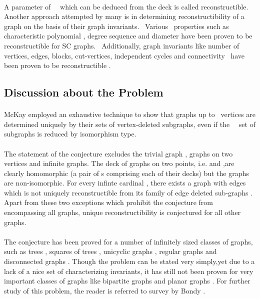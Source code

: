 \documentclass[12pt,conference]{IEEEtran}
\begin{document}
\paragraph*{} A parameter of    which can be deduced from the deck is called reconstructible.  Another approach attempted by many is in determining reconstructibility of a graph on the basis of their graph invariants.  Various  properties such as  characteristic polynomial \cite{e1}, degree sequence \cite{w1} and diameter \cite{s2} have been proven to be reconstructible for SC graphs.  Additionally, graph invariants like number of vertices, edges, blocks, cut-vertices, independent cycles and connectivity  have been proven to be reconstructible \cite{k2}. 

\subsection{ Discussion about the Problem }
\paragraph*{} McKay\cite{b1} employed an exhaustive technique to show that graphs up to   vertices are determined uniquely by their sets of vertex-deleted subgraphs, even if the   set of subgraphs is reduced by isomorphism type.  
\paragraph*{} The statement of the conjecture excludes the trivial graph , graphs on two vertices and infinite graphs. The deck of graphs on two points, i.e.  and ,are clearly homomorphic (a pair of s comprising each of their decks) but the graphs are non-isomorphic. For every infinte cardinal , there exists a graph with  edges which is not uniquely reconstructible from its family of edge deleted sub-graphs \cite{c1} .
Apart from these two exceptions which prohibit the conjecture from encompassing all graphs, unique reconstructibility is conjectured for all other graphs.
\paragraph*{} The conjecture has been proved for a number of infinitely sized classes of graphs, such as trees \cite{k1}, squares of trees \cite{s1}, unicyclic graphs \cite{m2}, regular graphs \cite{n2} and disconnected graphs \cite{h2}. Though the problem can be stated very simply,yet due to a lack of a nice set of characterizing invariants, it has still not been proven for very important classes of graphs like bipartite graphs \cite{b3} and planar graphs \cite{b3}. For further study of this problem, the reader is referred to survey by Bondy \cite{b3}. 
\end{document}
